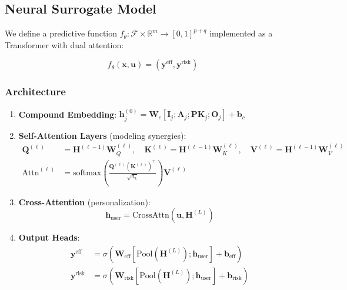 \documentclass[12pt, a4paper]{article}
\begin{document}
\subsection{Neural Surrogate Model}

We define a predictive function $f_\theta: \mathcal{F} \times \mathbb{R}^m \to [0,1]^{p+q}$ implemented as a Transformer with dual attention:

\begin{equation}
f_\theta(\mathbf{x}, \mathbf{u}) = (\mathbf{y}^{\text{eff}}, \mathbf{y}^{\text{risk}})
\end{equation}

\subsubsection{Architecture}

\begin{enumerate}
    \item \textbf{Compound Embedding}: $\mathbf{h}_j^{(0)} = \mathbf{W}_c [\mathbf{I}_j; \mathbf{A}_j; \mathbf{PK}_j; \mathbf{O}_j] + \mathbf{b}_c$
    
    \item \textbf{Self-Attention Layers} (modeling synergies):
    \begin{align}
        \mathbf{Q}^{(\ell)} &= \mathbf{H}^{(\ell-1)} \mathbf{W}_Q^{(\ell)}, \quad
        \mathbf{K}^{(\ell)} = \mathbf{H}^{(\ell-1)} \mathbf{W}_K^{(\ell)}, \quad
        \mathbf{V}^{(\ell)} = \mathbf{H}^{(\ell-1)} \mathbf{W}_V^{(\ell)} \\
        \text{Attn}^{(\ell)} &= \text{softmax}\left(\frac{\mathbf{Q}^{(\ell)} (\mathbf{K}^{(\ell)})^\top}{\sqrt{d_k}}\right) \mathbf{V}^{(\ell)}
    \end{align}
    
    \item \textbf{Cross-Attention} (personalization):
    \begin{equation}
        \mathbf{h}_{\text{user}} = \text{CrossAttn}(\mathbf{u}, \mathbf{H}^{(L)})
    \end{equation}
    
    \item \textbf{Output Heads}:
    \begin{align}
        \mathbf{y}^{\text{eff}} &= \sigma(\mathbf{W}_{\text{eff}} [\text{Pool}(\mathbf{H}^{(L)}); \mathbf{h}_{\text{user}}] + \mathbf{b}_{\text{eff}}) \\
        \mathbf{y}^{\text{risk}} &= \sigma(\mathbf{W}_{\text{risk}} [\text{Pool}(\mathbf{H}^{(L)}); \mathbf{h}_{\text{user}}] + \mathbf{b}_{\text{risk}})
    \end{align}
\end{enumerate}
\end{document}
